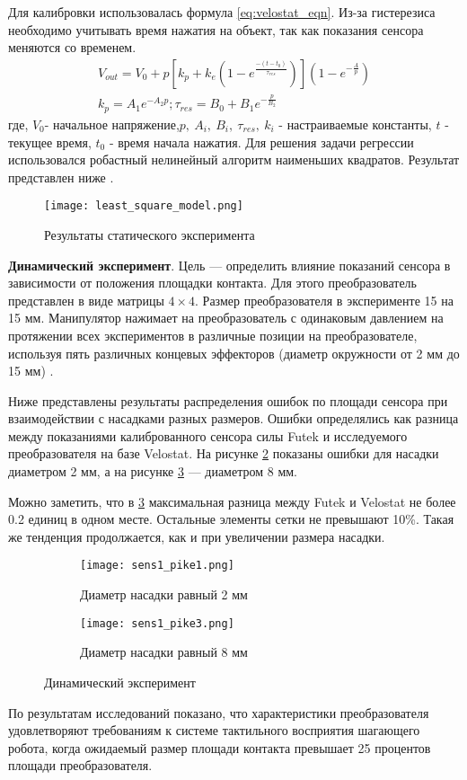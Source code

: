 Для калибровки использовалась формула \eqref{eq:velostat_eqn}. Из-за гистерезиса необходимо учитывать время нажатия на объект, так как показания сенсора меняются со временем.
\begin{align}
    \label{eq:velostat_eqn}
    V_{out} = V_0 + p[k_p + k_e(1-e^\frac{-(t-t_0)}{\tau_{res}})](1-e^{-\frac{A}{p}}) \\
    k_p = A_1e^{-A_2p}; \tau_{res} = B_0 + B_1e^{-\frac{p}{B_2}}
\end{align}
где,  $V_0$- начальное напряжение,$p,\ A_i,\ B_i,\ \tau_{res},\ k_i$  - настраиваемые константы, $t$ - текущее время, $t_0$ - время начала нажатия.
Для решения задачи регрессии использовался робастный нелинейный алгоритм наименьших квадратов. Результат представлен ниже .

\begin{figure}[H]
    \centering\texttt{[image: least\_square\_model.png]}
    \caption{Результаты статического эксперимента}
    \label{fig:least_square_model.png}
\end{figure}

\textbf{Динамический эксперимент}. Цель --- определить влияние показаний сенсора в зависимости от положения площадки контакта. Для этого преобразователь представлен в виде матрицы $4 \times 4$. Размер преобразователя в эксперименте 15 на 15 мм. Манипулятор нажимает на преобразователь с одинаковым давлением на протяжении всех экспериментов в различные позиции на преобразователе, используя пять различных концевых эффекторов (диаметр окружности от 2 мм до 15 мм) .



Ниже  представлены результаты распределения ошибок по площади сенсора при взаимодействии с насадками разных размеров. Ошибки определялись как разница между показаниями калиброванного сенсора силы Futek и исследуемого преобразователя на базе Velostat. На рисунке \ref{fig:sens1_pike1} показаны ошибки для насадки диаметром 2 мм, а на рисунке \ref{fig:sens1_pike3} --- диаметром 8 мм.

Можно заметить, что в \ref{fig:sens1_pike3} максимальная разница между Futek и Velostat не более 0.2 единиц в одном месте. Остальные элементы сетки не превышают 10\%. Такая же тенденция продолжается, как и при увеличении размера насадки.

\begin{figure}[H]
    \begin{subfigure}{0.49\textwidth}
        \centering\texttt{[image: sens1\_pike1.png]}
        \caption{Диаметр насадки равный 2 мм }
        \label{fig:sens1_pike1}
    \end{subfigure}
    \begin{subfigure}{0.49\textwidth}
        \centering\texttt{[image: sens1\_pike3.png]}
        \caption{Диаметр насадки равный 8 мм }
        \label{fig:sens1_pike3}
    \end{subfigure}
    \caption{Динамический эксперимент}
    \label{fig:dynamics_exp}
\end{figure}

По результатам исследований показано, что характеристики преобразователя удовлетворяют требованиям к системе тактильного восприятия шагающего робота, когда ожидаемый размер площади контакта превышает 25 процентов площади преобразователя.